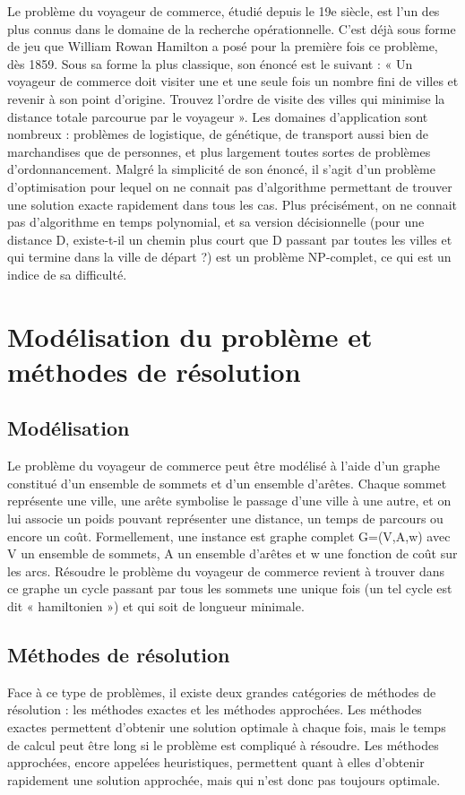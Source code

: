\documentclass[12pt, openany]{report}
\begin{document}
Le problème du voyageur de commerce, étudié depuis le 19e siècle, est l’un des plus connus dans le domaine de la recherche opérationnelle. C’est déjà sous forme de jeu que William Rowan Hamilton a posé pour la première fois ce problème, dès 1859. Sous sa forme la plus classique, son énoncé est le suivant : « Un voyageur de commerce doit visiter une et une seule fois un nombre fini de villes et revenir à son point d’origine. Trouvez l’ordre de visite des villes qui minimise la distance totale parcourue par le voyageur ». Les domaines d’application sont nombreux : problèmes de logistique, de génétique, de transport aussi bien de marchandises que de personnes, et plus largement toutes sortes de problèmes d’ordonnancement.
Malgré la simplicité de son énoncé, il s'agit d'un problème d'optimisation pour lequel on ne connait pas d'algorithme permettant de trouver une solution exacte rapidement dans tous les cas. Plus précisément, on ne connait pas d'algorithme en temps polynomial, et sa version décisionnelle (pour une distance D, existe-t-il un chemin plus court que D passant par toutes les villes et qui termine dans la ville de départ ?) est un problème NP-complet, ce qui est un indice de sa difficulté.
\setlength{\parindent}{1cm}\section{Modélisation du problème et méthodes de résolution}
\setlength{\parindent}{1cm}\subsection{Modélisation}
Le problème du voyageur de commerce peut être modélisé à l’aide d’un graphe constitué d’un ensemble de sommets et d’un ensemble d’arêtes. Chaque sommet représente une ville, une arête symbolise le passage d’une ville à une autre, et on lui associe un poids pouvant représenter une distance, un temps de parcours ou encore un coût. Formellement, une instance est graphe complet G=(V,A,w) avec V un ensemble de sommets, A un ensemble d’arêtes et w une fonction de coût sur les arcs.
Résoudre le problème du voyageur de commerce revient à trouver dans ce graphe un cycle passant par tous les sommets une unique fois (un tel cycle est dit « hamiltonien ») et qui soit de longueur minimale.
\setlength{\parindent}{1cm}\subsection{Méthodes de résolution}
Face à ce type de problèmes, il existe deux grandes catégories de méthodes de résolution : les méthodes exactes et les méthodes approchées. Les méthodes exactes permettent d’obtenir une solution optimale à chaque fois, mais le temps de calcul peut être long si le problème est compliqué à résoudre. Les méthodes approchées, encore appelées heuristiques, permettent quant à elles d’obtenir rapidement une solution approchée, mais qui n’est donc pas toujours optimale.
\end{document}
